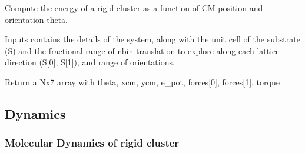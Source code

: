 \documentclass[letterpaper,10pt,english]{sphinxmanual}
\begin{document}
\begin{fulllineitems}
\label{\detokenize{static_rototrasl_map:static_rototrasl_map.static_rototraslmap}}
\pysigstartsignatures
{}
\pysigstopsignatures
\sphinxAtStartPar
Compute the energy of a rigid cluster as a function of CM position and orientation theta.

\sphinxAtStartPar
Inputs contains the details of the system, along with the unit cell of the substrate (S) and the fractional range of nbin translation to explore along each lattice direction (S{[}0{]}, S{[}1{]}), and range of orientations.

\sphinxAtStartPar
Return a Nx7 array with theta, xcm, ycm, e\_pot, forces{[}0{]}, forces{[}1{]}, torque

\end{fulllineitems}



\subsection{Dynamics}
\label{\detokenize{modules:dynamics}}
\sphinxstepscope


\subsubsection{Molecular Dynamics of rigid cluster}
\label{\detokenize{md_rigid_rototrasl:module-MD_rigid_rototrasl}}\label{\detokenize{md_rigid_rototrasl:molecular-dynamics-of-rigid-cluster}}\label{\detokenize{md_rigid_rototrasl::doc}}
\end{document}
